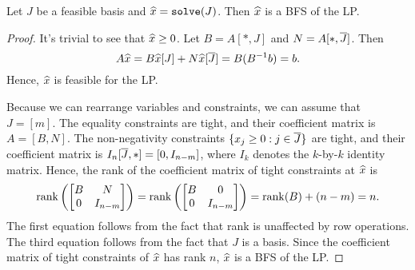 \begin{lemma}
\label{thm:basis-gives-bfs}
Let $J$ be a feasible basis and $\widehat{x} = \operatorname{\mathtt{solve}}(J)$.
Then $\widehat{x}$ is a BFS of the LP.
\end{lemma}
\begin{proof}
It's trivial to see that $\widehat{x} \ge 0$. Let $B = A[*,J]$ and $N = A[*,\overline{J}]$. Then
\[ A\widehat{x} = B\widehat{x}[J] + N\widehat{x}[\overline{J}] = B(B^{-1}b) = b. \]
Hence, $\widehat{x}$ is feasible for the LP.

Because we can rearrange variables and constraints, we can assume \wLoG{} that $J = [m]$.
The equality constraints are tight, and their coefficient matrix is $A = [B, N]$.
The non-negativity constraints $\{x_j \ge 0: j \in \overline{J}\}$ are tight,
and their coefficient matrix is $I_n[\overline{J},*] = [0, I_{n-m}]$,
where $I_k$ denotes the $k$-by-$k$ identity matrix.
Hence, the rank of the coefficient matrix of tight constraints at $\widehat{x}$ is
\[ \operatorname{rank}\left(\begin{bmatrix}B & N \\ 0 & I_{n-m}\end{bmatrix}\right)
= \operatorname{rank}\left(\begin{bmatrix}B & 0 \\ 0 & I_{n-m}\end{bmatrix}\right)
= \operatorname{rank}(B) + (n-m) = n. \]
The first equation follows from the fact that rank is unaffected by row operations.
The third equation follows from the fact that $J$ is a basis.
Since the coefficient matrix of tight constraints of $\widehat{x}$ has rank $n$,
$\widehat{x}$ is a BFS of the LP.
\end{proof}


